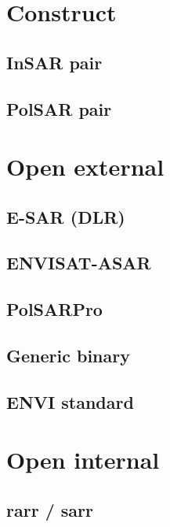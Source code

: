 \newpage 
\section{Construct}
\subsection{InSAR pair}
\subsection{PolSAR pair}

\newpage 
\section{Open external}
\subsection{E-SAR (DLR)}
\subsection{ENVISAT-ASAR}

\subsection{PolSARPro}
\subsection{Generic binary}
\subsection{ENVI standard}

\newpage 
\section{Open internal}
\subsection{rarr / sarr}
